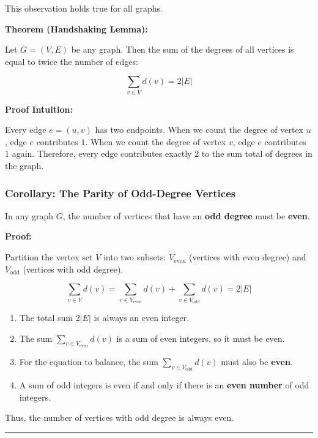 \documentclass[
]{book}
\providecommand{\tightlist}{%
  \setlength{\itemsep}{0pt}\setlength{\parskip}{0pt}}
\theoremstyle{definition}
\theoremstyle{definition}
\theoremstyle{definition}
\theoremstyle{definition}
\theoremstyle{remark}
\begin{document}
This observation holds true for all graphs.

\textbf{Theorem (Handshaking Lemma):}

Let \(G = (V, E)\) be any graph. Then the sum of the degrees of all vertices is equal to twice the number of edges:

\[\sum_{v \in V} d(v) = 2\vert{}E\vert{}\]

\textbf{Proof Intuition:}

Every edge \(e = (u, v)\) has two endpoints. When we count the degree of vertex \(u\), edge \(e\) contributes \(1\). When we count the degree of vertex \(v\), edge \(e\) contributes \(1\) again. Therefore, every edge contributes exactly \(2\) to the sum total of degrees in the graph.

\subsubsection{Corollary: The Parity of Odd-Degree Vertices}\label{corollary-the-parity-of-odd-degree-vertices}

In any graph \(G\), the number of vertices that have an \textbf{odd degree} must be \textbf{even}.

\textbf{Proof:}

Partition the vertex set \(V\) into two subsets: \(V_{\text{even}}\) (vertices with even degree) and \(V_{\text{odd}}\) (vertices with odd degree).

\[\sum_{v \in V} d(v) = \sum_{v \in V_{\text{even}}} d(v) + \sum_{v \in V_{\text{odd}}} d(v) = 2\vert{}E\vert{}\]

\begin{enumerate}
\def\labelenumi{\arabic{enumi}.}
\tightlist
\item
  The total sum \(2\vert{}E\vert{}\) is always an even integer.
\item
  The sum \(\sum_{v \in V_{\text{even}}} d(v)\) is a sum of even integers, so it must be even.
\item
  For the equation to balance, the sum \(\sum_{v \in V_{\text{odd}}} d(v)\) must also be \textbf{even}.
\item
  A sum of odd integers is even if and only if there is an \textbf{even number} of odd integers.
\end{enumerate}

Thus, the number of vertices with odd degree is always even.

\begin{center}\rule{0.5\linewidth}{0.5pt}\end{center}
\end{document}
